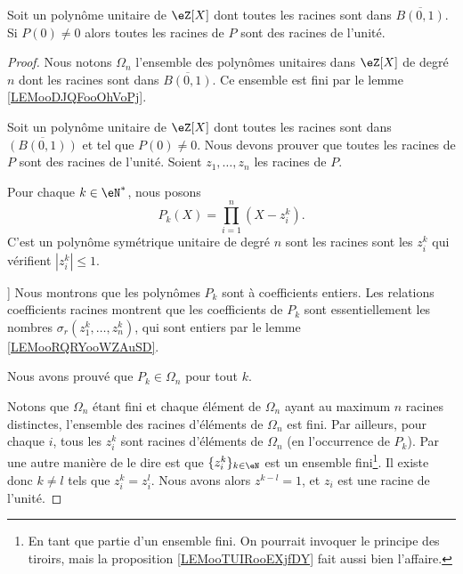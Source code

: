 \begin{proposition}	\label{PROPooINGJooPkByVP}
	Soit un polynôme unitaire de \( \eZ[X] \) dont toutes les racines sont dans \( \overline{B(0,1)}\). Si \( P(0)\neq 0 \) alors toutes les racines de \( P\) sont des racines de l'unité.
\end{proposition}

\begin{proof}
	Nous notons \( \Omega_n\) l'ensemble des polynômes unitaires dans \( \eZ[X]\) de degré \( n\) dont les racines sont dans \( \overline{B(0,1)}\). Ce ensemble est fini par le lemme \ref{LEMooDJQFooOhVoPj}.

	Soit un polynôme unitaire de \( \eZ[X]\) dont toutes les racines sont dans \( \overline{(B(0,1))}\) et tel que \( P(0)\neq 0\). Nous devons prouver que toutes les racines de \( P\) sont des racines de l'unité. Soient \( z_1,\ldots,z_n\) les racines de \( P\).

	\begin{subproof}
		Pour chaque \( k\in \eN^*\), nous posons
		\begin{equation}
			P_k(X)=\prod_{i=1}^n(X-z_i^k).
		\end{equation}
		C'est un polynôme symétrique unitaire de degré \( n\) sont les racines sont les \( z_i^k\) qui vérifient \( | z_i^k |\leq 1\).

		\spitem[\( P_k\in \eZ[X]\)]
		Nous montrons que les polynômes \( P_k\) sont à coefficients entiers. Les relations coefficients racines montrent que les coefficients de \( P_k\) sont essentiellement les nombres \( \sigma_r(z^k_1,\ldots,z_n^k)\), qui sont entiers par le lemme \ref{LEMooRQRYooWZAuSD}.
	\end{subproof}
	Nous avons prouvé que \( P_k\in \Omega_n\) pour tout \( k\).

	Notons que \( \Omega_n\) étant fini et chaque élément de \( \Omega_n\) ayant au maximum \( n\) racines distinctes, l'ensemble des racines d'éléments de \( \Omega_n\) est fini. Par ailleurs, pour chaque \( i\), tous les \( z_i^k\) sont racines d'éléments de \( \Omega_n\) (en l'occurrence de \( P_k\)). Par une autre manière de le dire est que \( \{ z_i^k \}_{k\in \eN}\) est un ensemble fini\footnote{En tant que partie d'un ensemble fini. On pourrait invoquer le principe des tiroirs, mais la proposition \ref{LEMooTUIRooEXjfDY} fait aussi bien l'affaire.}. Il existe donc \( k\neq l \) tels que \( z_i^k=z_i^l\). Nous avons alors \( z^{k-l}=1\), et \( z_i\) est une racine de l'unité.
\end{proof}


